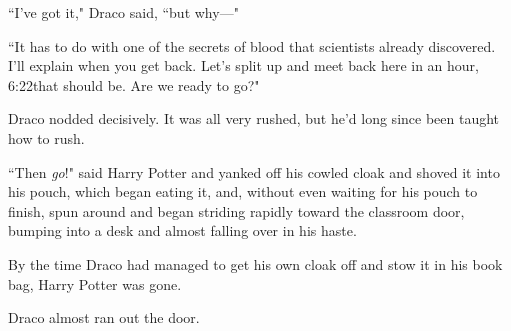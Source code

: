 ``I've got it," Draco said, ``but why—"

``It has to do with one of the secrets of blood that scientists already discovered. I'll explain when you get back. Let's split up and meet back here in an hour, 6:22\pm that should be. Are we ready to go?"

Draco nodded decisively. It was all very rushed, but he'd long since been taught how to rush.

``Then \emph{go}!" said Harry Potter and yanked off his cowled cloak and shoved it into his pouch, which began eating it, and, without even waiting for his pouch to finish, spun around and began striding rapidly toward the classroom door, bumping into a desk and almost falling over in his haste.

By the time Draco had managed to get his own cloak off and stow it in his book bag, Harry Potter was gone.

Draco almost ran out the door.

